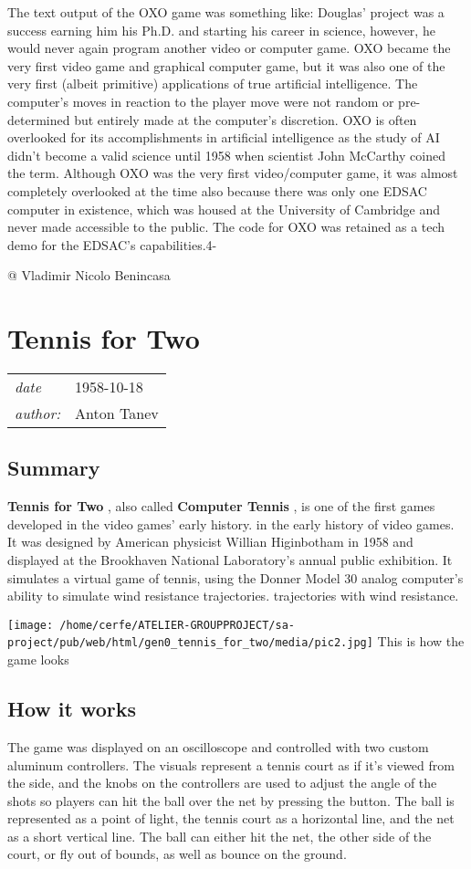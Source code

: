 \documentclass[a4paper,10pt]{book}
\newcommand{\pageHeader}[4]{
    \section{#1}
    \vspace{-0.3cm}
    \begin{table}[h!]
     \begin{tabular}{ll}
        \hline
        \textit{date} & #2 \\
        \textit{author: } & #3\\
        \hline
     \end{tabular}
    \end{table}
    \vspace{-0.3cm}
}
\begin{document}
The text output of the OXO game was something like:
Douglas' project was a success earning him his Ph.D. and starting his career in science, however, he would never again program another video or computer game.
OXO  became the very first video game and graphical computer game, but it was also one of the very first (albeit primitive) applications of true artificial intelligence. The computer's moves in reaction to the player move were not random or pre-determined but entirely made at the computer's discretion. OXO is often overlooked for its accomplishments in artificial intelligence as the study of AI didn't become a valid science until 1958 when scientist John McCarthy coined the term.
Although OXO was the very first video/computer game, it was almost completely overlooked at the time also because there was only one EDSAC computer in existence, which was housed at the University of Cambridge and never made accessible to the public.
The code for OXO was retained as a tech demo for the EDSAC's capabilities.4-

         
 
 @ Vladimir Nicolo Benincasa 
 
 \newpage\pageHeader{Tennis for Two}{1958-10-18}{Anton Tanev}{A sports video game simulating a game of Tennis}
 \subsection{Summary }
 
 \textbf{Tennis for Two } , also called  \textbf{Computer Tennis } , is one of the first games developed in the video games' early history.
             in the early history of video games.  It was designed by American physicist Willian Higinbotham in 1958 and displayed at the
          Brookhaven National Laboratory's annual public exhibition. It simulates a virtual game of tennis, using
          the Donner Model 30 analog computer's ability to simulate wind resistance trajectories.  trajectories with wind resistance. 
 
 
 
 \texttt{[image: /home/cerfe/ATELIER-GROUPPROJECT/sa-project/pub/web/html/gen0\_tennis\_for\_two/media/pic2.jpg]}
 This is how the game looks 
 
 
 \subsection{How it works }
 
        The game was displayed on an oscilloscope and controlled with two custom aluminum controllers. The visuals
        represent a tennis court as if it's viewed from the side, and the knobs on the controllers are used to adjust
        the angle of the shots so players can hit the ball over the net by pressing the button. The ball is represented
        as a point of light, the tennis court as a horizontal line, and the net as a short vertical line. The ball
        can either hit the net, the other side of the court, or fly out of bounds, as well as bounce on the ground.
         
\end{document}
